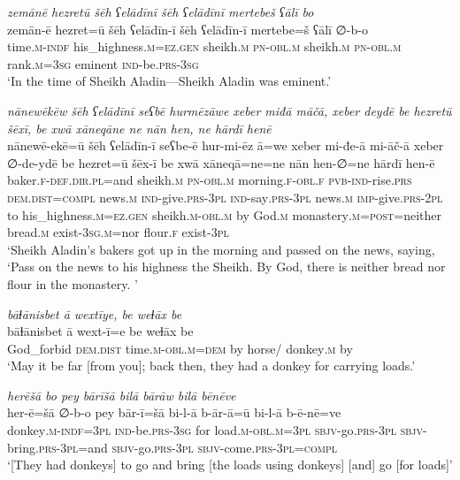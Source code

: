 \ea \label{HB.1}
\textit{zemānē hezretū šēh ʕelādīnī šēh ʕelādīnī mertebeš ʕālī bo} \\ 
\gll zemān-ē hezret=ū šēh ʕelādīn-ī šēh ʕelādīn-ī mertebe=š ʕālī ∅-b-o \\ 
 time\textsc{.m}\textsc{-indf} his\_highness\textsc{.m}\textsc{=ez}\textsc{.gen} sheikh\textsc{.m} \textsc{pn}\textsc{-obl}\textsc{.m} sheikh\textsc{.m} \textsc{pn}\textsc{-obl}\textsc{.m} rank\textsc{.m}\textsc{=3sg} eminent \textsc{ind-}be\textsc{.prs}\textsc{-3sg} \\ 
\glt `In the time of Sheikh Aladin—Sheikh Aladin was eminent.'
\z 
 
\ea \label{HB.2}
\textit{nānewēkēw šēh ʕelādīnī seʕbē hurmēzāwe xeber miđā māčā, xeber deydē be hezretū šēxī, be xwā xāneqāne ne nān hen, ne hārdī henē} \\ 
\gll nānewē-ekē=ū šēh ʕelādīn-ī seʕbe-ē hur-mi-ēz ā=we xeber mi-đe-ā mi-āč-ā xeber ∅-de-ydē be hezret=ū šēx-ī be xwā xāneqā=ne=ne nān hen-∅=ne hārdī hen-ē \\ 
 baker\textsc{\textsc{.f}}\textsc{-def}\textsc{.dir}\textsc{.pl}=and sheikh\textsc{.m} \textsc{pn}\textsc{-obl}\textsc{.m} morning\textsc{\textsc{.f}}\textsc{-obl}\textsc{\textsc{.f}} \textsc{pvb-}\textsc{ind-}rise\textsc{.prs} \textsc{dem.dist}\textsc{=compl} news\textsc{.m} \textsc{ind-}give\textsc{.prs}\textsc{-3pl} \textsc{ind-}say\textsc{.prs}\textsc{-3pl} news\textsc{.m} \textsc{imp-}give\textsc{.prs}\textsc{-2pl} to his\_highness\textsc{.m}\textsc{=ez}\textsc{.gen} sheikh\textsc{.m}\textsc{-obl}\textsc{.m} by God\textsc{.m} monastery\textsc{.m}\textsc{=\textsc{post}}=neither bread\textsc{.m} exist\textsc{-3sg}\textsc{.m}=nor flour\textsc{\textsc{.f}} exist\textsc{-3pl} \\ 
\glt `Sheikh Aladin’s bakers got up in the morning and passed on the news, saying, ‘Pass on the news to his highness the Sheikh. By God, there is neither bread nor flour in the monastery. '
\z 
 
\ea \label{HB.8}
\textit{bāɫānisbet ā wextīye, be weɫāx be} \\ 
\gll bāɫānisbet ā wext-ī=e be weɫāx be \\ 
 God\_forbid \textsc{dem.dist} time\textsc{.m}\textsc{-obl}\textsc{.m}\textsc{=dem} by horse/ donkey\textsc{.m} by \\ 
\glt `May it be far [from you]; back then, they had a donkey for carrying loads.'
\z 
 
\ea \label{HB.9}
\textit{herēšā bo pey bārīšā bilā bārāw bilā bēnēve} \\ 
\gll her-ē=šā ∅-b-o pey bār-ī=šā bi-l-ā b-ār-ā=ū bi-l-ā b-ē-nē=ve \\ 
 donkey\textsc{.m}\textsc{-indf}\textsc{=3pl} \textsc{ind-}be\textsc{.prs}\textsc{-3sg} for load\textsc{.m}\textsc{-obl}\textsc{.m}\textsc{=3pl} \textsc{sbjv-}go\textsc{.prs}\textsc{-3pl} \textsc{sbjv-}bring\textsc{.prs}\textsc{-3pl}=and \textsc{sbjv-}go\textsc{.prs}\textsc{-3pl} \textsc{sbjv-}come\textsc{.prs}\textsc{-3pl}\textsc{=compl} \\ 
\glt `[They had donkeys] to go and bring [the loads using donkeys] [and] go [for loads]'
\z 
 
